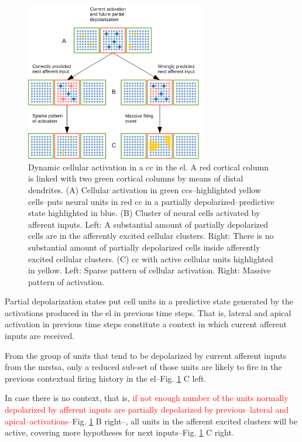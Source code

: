 \documentclass[10pt,letterpaper]{article}
\begin{document}
\begin{figure}[h!]
    \centering
    \includegraphics[width=0.7\textwidth]{Activation.png}
    \caption{Dynamic cellular activation in a \gls{cc} in the \gls{el}.
    A red cortical column is linked with two green cortical columns by means of distal dendrites.
    (A) Cellular activation in green \glspl{cc}--highlighted yellow cells--puts neural units
    in red \gls{cc} in a partially depolarized--predictive state highlighted in blue.
    (B) Cluster of neural cells activated by afferent inputs.
    Left: A substantial amount of partially depolarized cells are in the afferently excited cellular clusters.
    Right: There is no substantial amount of partially depolarized cells inside afferently excited cellular clusters.
    (C) \gls{cc} with active cellular units highlighted in yellow.
    Left: Sparse pattern of cellular activation.
    Right: Massive pattern of activation.}
    \label{fig:Activation}
\end{figure}

\pagebreak

Partial depolarization states put cell units in a predictive state generated by
the activations produced in the \gls{el} in previous time steps.
That is, lateral and apical activation in previous time steps constitute a context in which
current afferent inputs are received.

From the group of units that tend to be depolarized by current afferent inputs from the \gls{mrstsa},
only a reduced sub-set of those units are likely to fire in the previous contextual firing history
in the \gls{el}--Fig. \ref{fig:Activation} C left.

In case there is no context, that is, \textcolor{red}{if not enough number of the units normally depolarized by afferent inputs
are partially depolarized by previous--lateral and apical--activations}--Fig. \ref{fig:Activation} B right--,
all units in the afferent excited clusters will be active, covering more hypotheses for next inputs--Fig. \ref{fig:Activation} C right.
\end{document}
